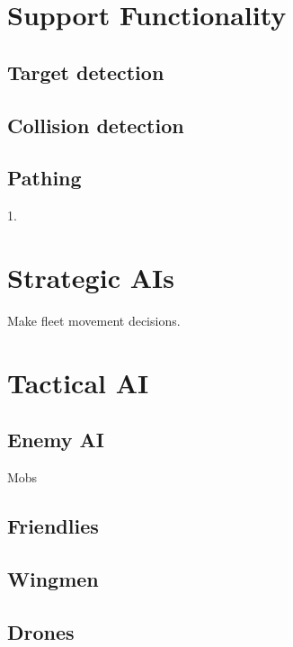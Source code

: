 \section{Support Functionality}
\subsection{Target detection}
\subsection{Collision detection}
\subsection{Pathing}         1. 
\section{Strategic AIs}
Make fleet movement decisions.
\section{Tactical AI}
\subsection{Enemy AI}
Mobs
\subsection{Friendlies}
\subsection{Wingmen}
\subsection{Drones}
